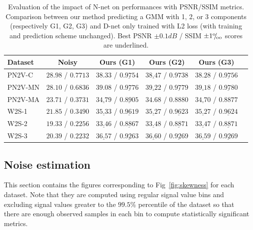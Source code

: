 \documentclass[lettersize,journal]{IEEEtran}
\def\permille{\ensuremath{{}^\text{o}\mkern-5mu/\mkern-3mu_\text{oo}}}
\begin{document}
\begin{table}[ht]
\caption{Evaluation of the impact of N-net on performances with PSNR/SSIM metrics. Comparison between our method predicting a GMM with 1, 2, or 3 components (respectively G1, G2, G3) and D-net only trained with L2 loss (with training and prediction scheme unchanged).
Best PSNR $\pm0.1dB$ / SSIM $\pm1\permille$ scores are underlined.}
\label{si:table:results}
\begin{center}
\begin{sc}
\begin{tabular}{lccccc}
\toprule
Dataset & Noisy & Ours (G1) & Ours (G2) & Ours (G3) \\
\midrule
PN2V-C & $28.98$ / $0.7713$ & $38.33$ / $\underline{0.9754}$ & $\underline{38.47}$ / $0.9738$ & $38.28$ / $\underline{0.9756}$ \\
PN2V-MN & $28.10$ / $0.6836$ & $39.08$ / $\underline{0.9776}$ & $\underline{39.22}$ / $\underline{0.9779}$ & $\underline{39.18}$ / $\underline{0.9780}$ \\
PN2V-MA & $23.71$ / $0.3731$ & $\underline{34.79}$ / $\underline{0.8905}$ & $34.68$ / $0.8880$ & $\underline{34.70}$ / $0.8877$ \\
W2S-1 & $21.85$ / $0.3490$ & $\underline{35.33}$ / $\underline{0.9619}$ & $\underline{35.27}$ / $\underline{0.9623}$ & $\underline{35.27}$ / $\underline{0.9624}$ \\
W2S-2 & $19.33$ / $0.2256$ & $\underline{33.46}$ / $\underline{0.8867}$ & $\underline{33.48}$ / $\underline{0.8871}$ & $\underline{33.47}$ / $\underline{0.8871}$ \\
W2S-3 & $20.39$ / $0.2232$ & $\underline{36.57}$ / $\underline{0.9263}$ & $\underline{36.60}$ / $\underline{0.9269}$ & $\underline{36.59}$ / $\underline{0.9269}$ \\
\bottomrule
\end{tabular}
\end{sc}
\end{center}
\end{table}

\subsection{Noise estimation}
\label{si:skewness}
This section contains the figures corresponding to Fig~\ref{fig:skewness} for each dataset.
Note that they are computed using regular signal value bins and excluding signal values greater to the $99.5\%$ percentile of the dataset so that there are enough observed samples in each bin to compute statistically significant metrics.
\end{document}
